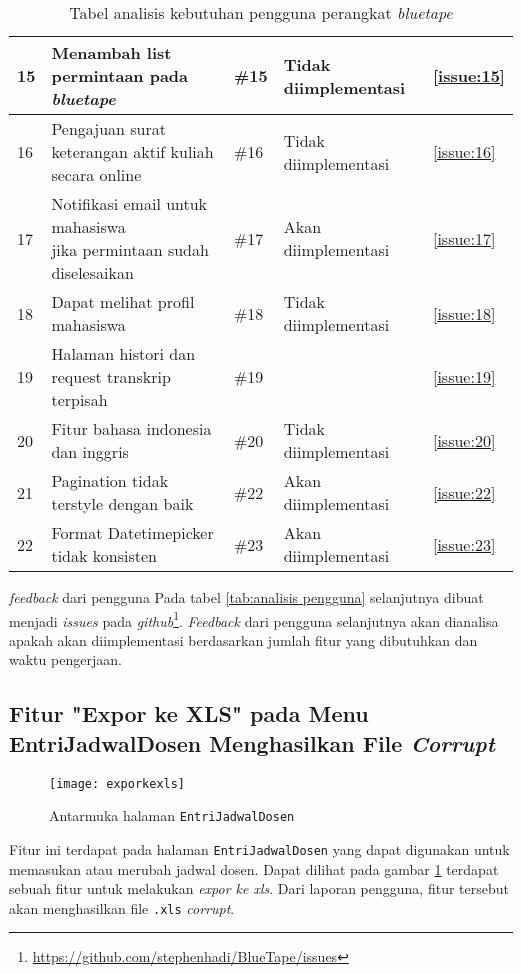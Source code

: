 \begin{table}[H]
{\begin{tabular}{|l|l|l|l|l|}
	15 & Menambah list permintaan pada \textit{bluetape} & \#15 & Tidak diimplementasi & \ref{issue:15} \\ \hline
	16 & Pengajuan surat keterangan aktif kuliah secara online & \#16 & Tidak diimplementasi & \ref{issue:16} \\ \hline
	17 & \makecell[l]{Notifikasi email untuk mahasiswa \\ jika permintaan sudah diselesaikan} & \#17 & Akan diimplementasi &  \ref{issue:17}\\ \hline
	18 & Dapat melihat profil mahasiswa & \#18 & Tidak diimplementasi & \ref{issue:18}\\ \hline
	19 & Halaman histori dan request transkrip terpisah & \#19 & & \ref{issue:19}\\ \hline
	20 & Fitur bahasa indonesia dan inggris & \#20 & Tidak diimplementasi & \ref{issue:20} \\ \hline
	21 & Pagination tidak terstyle dengan baik & \#22 & Akan diimplementasi & \ref{issue:22}\\ \hline
	22 & Format Datetimepicker tidak konsisten &\#23 & Akan diimplementasi & \ref{issue:23}\\ \hline
	
	
	\end{tabular}}
	\caption{Tabel analisis kebutuhan pengguna perangkat \textit{bluetape}}
\end{table}


\textit{feedback} dari pengguna Pada tabel \ref{tab:analisis pengguna} selanjutnya dibuat menjadi \textit{issues} pada \textit{github}\footnote{\url{https://github.com/stephenhadi/BlueTape/issues}}. \textit{Feedback} dari pengguna selanjutnya akan dianalisa apakah akan diimplementasi berdasarkan jumlah fitur yang dibutuhkan dan waktu pengerjaan.


\subsection{Fitur "Expor ke XLS" pada Menu EntriJadwalDosen Menghasilkan File  \textit{Corrupt}}
\label{issue:1}
\begin{figure}[H]
	\centering
	\texttt{[image: exporkexls]} 
	\caption{Antarmuka halaman \texttt{EntriJadwalDosen}}
	\label{fig:EntriJadwalDosen} 
\end{figure}

Fitur ini terdapat pada halaman \texttt{EntriJadwalDosen} yang dapat digunakan untuk memasukan atau merubah jadwal dosen. Dapat dilihat pada gambar \ref{fig:EntriJadwalDosen} terdapat sebuah fitur untuk melakukan \textit{expor ke xls}. Dari laporan pengguna, fitur tersebut akan menghasilkan file \texttt{.xls} \textit{corrupt}.

